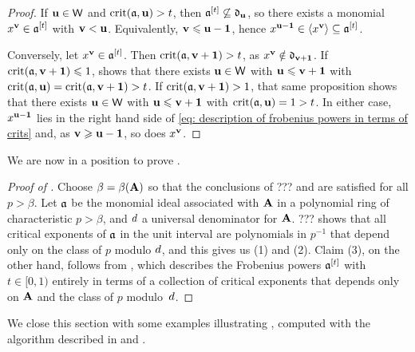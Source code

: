 \documentclass{article}
\begin{document}
\begin{proof}
   If $\mathbf{u} \in \mathsf{W}$ and $\operatorname{crit}(\mathfrak{a}, \mathbf{u}) > t$, then $\mathfrak{a}^{[t]}\not\subseteq \mathfrak{d}_{\mathbf{u}}$, so there exists a monomial $x^{\mathbf{v}} \in \mathfrak{a}^{[t]}$ with $\mathbf{v} < \mathbf{u}$.
   Equivalently, $\mathbf{v} \leqslant \mathbf{u}-\mathbf{1}$, hence $x^{\mathbf{u}-\mathbf{1}}\in \langle x^{\mathbf{v}} \rangle\subseteq \mathfrak{a}^{[t]}$.
   
   Conversely, let $x^{\mathbf{v}}\in \mathfrak{a}^{[t]}$.
   Then $\operatorname{crit}(\mathfrak{a},\mathbf{v}+\mathbf{1}) > t$, as $x^{\mathbf{v}}\notin \mathfrak{d}_{\mathbf{v}+\mathbf{1}}$.
   If $\operatorname{crit}(\mathfrak{a}, \mathbf{v}+\mathbf{1}) \leqslant 1$,  shows that there exists $\mathbf{u} \in \mathsf{W}$ with $\mathbf{u} \leqslant \mathbf{v} +\mathbf{1}$ with $\operatorname{crit}(\mathfrak{a},\mathbf{u}) = \operatorname{crit}(\mathfrak{a}, \mathbf{v}+\mathbf{1}) > t$.
   If $\operatorname{crit}(\mathfrak{a}, \mathbf{v}+\mathbf{1}) > 1$, that same proposition shows that there exists $\mathbf{u} \in \mathsf{W}$ with $\mathbf{u} \leqslant \mathbf{v} +\mathbf{1}$ with $\operatorname{crit}(\mathfrak{a},\mathbf{u}) = 1 > t$.
   In either case,  $x^{\mathbf{u}-\mathbf{1}}$ lies in the right hand side of \eqref{eq: description of frobenius powers in terms of crits} and, as $\mathbf{v} \geqslant \mathbf{u} - \mathbf{1}$, so does $x^{\mathbf{v}}$.
\end{proof}

We are now in a position to prove .

\begin{proof}[Proof of ]
   Choose $\beta = \beta(\mathbf{A})$ so that the conclusions of ???  and  are satisfied for all $p>\beta$.
   Let $\mathfrak{a}$ be the monomial ideal associated with $\mathbf{A}$ in a polynomial ring of characteristic $p>\beta$, and $d$ a universal denominator for $\mathbf{A}$.
   ??? shows that all critical exponents of $\mathfrak{a}$ in the unit interval are polynomials in $p^{-1}$ that depend only on the class of $p$ modulo $d$, and this gives us (1) and (2).
   Claim (3), on the other hand, follows from , which describes the Frobenius powers $\mathfrak{a}^{[t]}$ with $t\in [0,1)$ entirely in terms of a collection of critical exponents that depends only on $\mathbf{A}$ and the class of $p$ modulo~$d$. 
\end{proof}

We close this section with some examples illustrating , computed with the algorithm described in  and .
\end{document}
